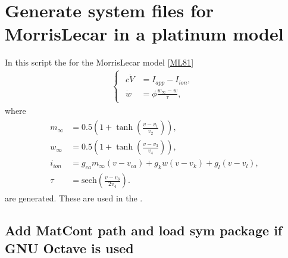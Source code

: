 \documentclass[letterpaper,10pt,english]{jupyterBook}
\begin{document}
\chapter{Generate system files for Morris\sphinxhyphen{}Lecar in a platinum model}
\label{\detokenize{Morris-LecarGenSym:generate-system-files-for-morris-lecar-in-a-platinum-model}}\label{\detokenize{Morris-LecarGenSym::doc}}
\sphinxAtStartPar
In this script the  for the Morris\sphinxhyphen{}Lecar model {[}\hyperlink{cite.references:id4}{ML81}{]}
\begin{equation*}
\begin{split}
\begin{cases}
\begin{aligned}
c\dot V &= I_{app} - I_{ion}, \\
\dot w &= \phi \frac{w_\infty -w}{\tau},
\end{aligned}
\end{cases}
\end{split}
\end{equation*}
\sphinxAtStartPar
where
\begin{equation*}
\begin{split}
\begin{aligned}
m_\infty &= 0.5 \left(1+\tanh\left(\frac{v-v_1}{v_2}\right)\right), \\
w_\infty &= 0.5 \left(1+\tanh\left(\frac{v-v_3}{v_4}\right)\right), \\
i_{ion} &= g_{ca} m_{\infty} (v-v_{ca}) + g_k w (v-v_k) + g_l (v-v_l), \\
\tau &= \text{sech}\left(\frac{v-v_3}{2v_4}\right).
\end{aligned}
\end{split}
\end{equation*}
\sphinxAtStartPar
are generated. These are used in the {\hyperref[\detokenize{Morris-Lecar::doc}]{}}.


\section{Add MatCont path and load sym package if GNU Octave is used}
\label{\detokenize{Morris-LecarGenSym:add-matcont-path-and-load-sym-package-if-gnu-octave-is-used}}
\begin{sphinxVerbatim}[commandchars=\\\{\}]
\PYG{p}{[}\PYG{p}{]}
\end{sphinxVerbatim}
\end{document}
